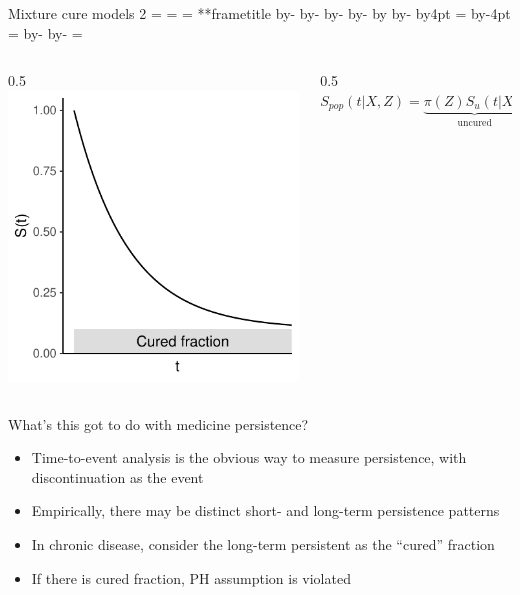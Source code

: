 \documentclass[aspectratio=169,12pt]{beamer} %
\makeatletter
\newif\ifsidebartheme
\newcommand*{\calculatespace}{%
    \contentheight=\paperheight%
    \ifx\beamer@frametitle\@empty%
        \setbox\@tempboxa=\box\voidb@x%
      \else%
        \setbox\@tempboxa=\vbox{%
          \vbox{}%
          {\parskip0pt\usebeamertemplate***{frametitle}}%
        }%
        \ifsidebartheme%
          \advance\contentheight by-1em%
        \fi%
      \fi%
    \advance\contentheight by-\ht\@tempboxa%
    \advance\contentheight by-\dp\@tempboxa%
    \advance\contentheight by-\beamer@frametopskip%
    \ifbeamer@plainframe%
    \contentbottom=0pt%
    \else%
    \advance\contentheight by-\headheight%
    \advance\contentheight by\headdp%
    \advance\contentheight by-\footheight%
    \advance\contentheight by4pt%
    \contentbottom=\footheight%
    \advance\contentbottom by-4pt%
    \fi%
    \contentwidth=\paperwidth%
    \ifbeamer@plainframe%
    \contentleft=0pt%
    \else%
    \advance\contentwidth by-\beamer@rightsidebar%
    \advance\contentwidth by-\beamer@leftsidebar\relax%
    \contentleft=\beamer@leftsidebar%
    \fi%
}
\makeatother
\begin{document}
\begin{frame}{Mixture cure models 2}
\calculatespace%
\begin{columns}
\begin{column}{0.5\contentwidth}
  \centering
  \includegraphics[height=0.7\textheight]{ref/surv3.pdf}
\end{column}
\begin{column}{0.5\contentwidth}
	$S_{pop}(t|X,Z)=\underbrace{\pi(Z)S_u(t|X)}_\text{uncured}+
	\underbrace{1-\pi(Z)}_\text{cured}$
\end{column}
\end{columns}
\end{frame}


\begin{frame}{What's this got to do with medicine persistence?}
	\begin{itemize}
		\item Time-to-event analysis is the obvious way to measure persistence, with discontinuation as the event
		\item Empirically, there may be distinct short- and long-term persistence patterns
		\item In chronic disease, consider the long-term persistent as the ``cured'' fraction
		\item If there is cured fraction, PH assumption is violated
	\end{itemize}
\end{frame}
\end{document}
